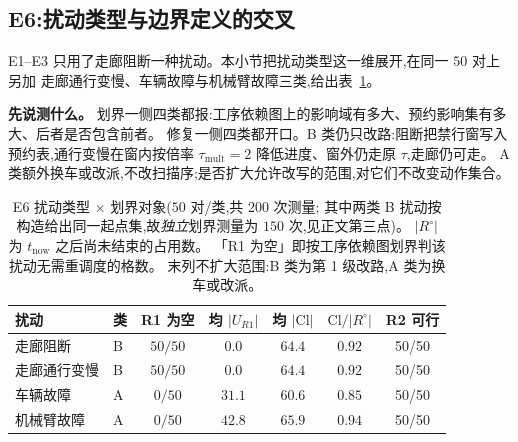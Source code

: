 \documentclass[manuscript,screen,review]{acmart}
\newcommand{\NPairs}{50}
\newcommand{\FeasESixBlock}{\NPairs/\NPairs}
\newcommand{\FeasSlow}{\NPairs/\NPairs}
\newcommand{\FeasESixAgv}{\NPairs/\NPairs}
\newcommand{\FeasESixRa}{\NPairs/\NPairs}
\begin{document}
\subsection{E6:扰动类型与边界定义的交叉}
\label{sec:e6}

E1--E3 只用了走廊阻断一种扰动。本小节把扰动类型这一维展开,在同一 \(\NPairs\) 对上另加
走廊通行变慢、车辆故障与机械臂故障三类,给出表~\ref{tab:e6}。

\textbf{先说测什么。} 划界一侧四类都报:工序依赖图上的影响域有多大、预约影响集有多大、后者是否包含前者。
修复一侧四类都开口。B 类仍只改路:阻断把禁行窗写入预约表,通行变慢在窗内按倍率
\(\tau_{\mathrm{mult}}=2\) 降低进度、窗外仍走原 \(\tau\),走廊仍可走。
A 类额外换车或改派,不改扫描序;是否扩大允许改写的范围,对它们不改变动作集合。

\begin{table}[t]
\centering
\caption{E6 扰动类型 \(\times\) 划界对象(\(\NPairs\) 对/类,共 \(200\) 次测量;
其中两类 B 扰动按构造给出同一起点集,故\emph{独立}划界测量为 \(150\) 次,见正文第三点)。
\(|R^{\circ}|\) 为 \(t_{\mathrm{now}}\) 之后尚未结束的占用数。
「R1 为空」即按工序依赖图划界判该扰动无需重调度的格数。
末列不扩大范围:B 类为第 1 级改路,A 类为换车或改派。}
\label{tab:e6}
\small
\begin{tabular}{@{}llccccc@{}}
\toprule
扰动 & 类 & R1 为空 & 均 \(|U_{R1}|\) & 均 \(|\mathrm{Cl}|\)
 & \(\mathrm{Cl}/|R^{\circ}|\) & R2 可行 \\
\midrule
走廊阻断   & B & \(50/50\) & \(0.0\)  & \(64.4\) & \(0.92\) & \FeasESixBlock \\
走廊通行变慢 & B & \(50/50\) & \(0.0\)  & \(64.4\) & \(0.92\) & \FeasSlow \\
车辆故障   & A & \(0/50\)  & \(31.1\) & \(60.6\) & \(0.85\) & \FeasESixAgv \\
机械臂故障 & A & \(0/50\)  & \(42.8\) & \(65.9\) & \(0.94\) & \FeasESixRa \\
\bottomrule
\end{tabular}
\end{table}
\end{document}
